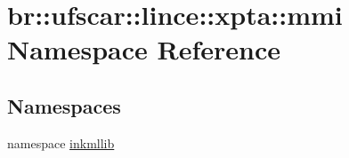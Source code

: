 \hypertarget{namespacebr_1_1ufscar_1_1lince_1_1xpta_1_1mmi}{
\section{br::ufscar::lince::xpta::mmi Namespace Reference}
\label{namespacebr_1_1ufscar_1_1lince_1_1xpta_1_1mmi}
}
\subsection*{Namespaces}
\begin{DoxyCompactItemize}
\item 
namespace \hyperlink{namespacebr_1_1ufscar_1_1lince_1_1xpta_1_1mmi_1_1inkmllib}{inkmllib}
\end{DoxyCompactItemize}

